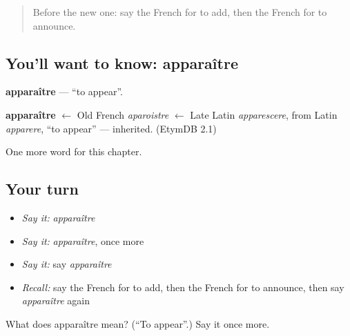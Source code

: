 \label{lesson:FR-C178-apparaitre}



\begin{quote}
Before the new one: say the French for to add, then the French for to announce.
\end{quote}

\subsection*{You'll want to know: apparaître}
\textbf{apparaître} — \textquotedblleft{}to appear\textquotedblright{}.

\begin{cousinweb}
\textbf{apparaître} $\leftarrow$ Old French \emph{aparoistre} $\leftarrow$ Late Latin \emph{apparescere}, from Latin \emph{apparere}, \textquotedblleft{}to appear\textquotedblright{} — inherited. (EtymDB 2.1)
\end{cousinweb}

\begin{grammarlens}[title={What you've built}]
One more word for this chapter.
\end{grammarlens}

\subsection*{Your turn}
\begin{itemize}
\raggedright
  \item \emph{Say it:} \emph{apparaître}
  \item \emph{Say it:} \emph{apparaître}, once more
  \item \emph{Say it:} say \emph{apparaître}
  \item \emph{Recall:} say the French for to add, then the French for to announce, then say \emph{apparaître} again
\end{itemize}

\begin{tcolorbox}[breakable,colback=teal!4,colframe=teal!35!black,title={Before you move on}]
What does apparaître mean? (\textquotedblleft{}To appear\textquotedblright{}.) Say it once more.
\end{tcolorbox}

